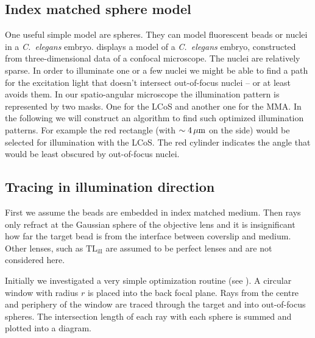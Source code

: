 \subsection{Index matched sphere model}
\label{sec:shadow-map}
One useful simple model are spheres. They can model fluorescent beads
or nuclei in a \emph{C.~elegans} embryo.  displays
a model of a \emph{C.~elegans} embryo, constructed from
three-dimensional data of a confocal microscope. The nuclei are
relatively sparse. In order to illuminate one or a few nuclei we might
be able to find a path for the excitation light that doesn't intersect
out-of-focus nuclei -- or at least avoids them. In our spatio-angular
microscope the illumination pattern is represented by two masks. One
for the LCoS and another one for the MMA. In the following we will
construct an algorithm to find such optimized illumination
patterns. For example the red rectangle (with $\sim\unit[4]{\mu m}$ on
the side) would be selected for illumination with the LCoS. The red
cylinder indicates the angle that would be least obscured by
out-of-focus nuclei.


\subsection{Tracing in illumination direction}

First we assume the beads are embedded in index matched medium. Then
rays only refract at the Gaussian sphere of the objective lens and it
is insignificant how far the target bead is from the interface between
coverslip and medium. Other lenses, such as $\textrm{TL}_\textrm{ill}$
are assumed to be perfect lenses and are not considered here.

Initially we investigated a very simple optimization routine (see
). A circular
window with radius $r$ is placed into the back focal plane. Rays from
the centre and periphery of the window are traced through the target
and into out-of-focus spheres. The intersection length of each ray
with each sphere is summed and plotted into a diagram.

